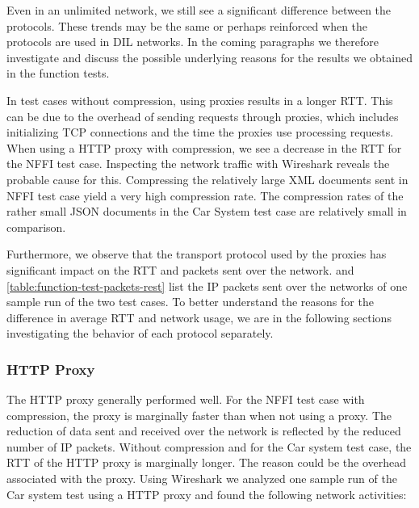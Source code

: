Even in an unlimited network, we still see a significant difference between the
protocols. These trends may be the same or perhaps reinforced when the protocols
are used in DIL networks. In the coming paragraphs we therefore investigate and
discuss the possible underlying reasons for the results we obtained in the
function tests.

In test cases without compression, using proxies results in a longer RTT. This
can be due to the overhead of sending requests through proxies, which includes
initializing TCP connections and the time the proxies use processing requests.
When using a HTTP proxy with compression, we see a decrease in the RTT for the
NFFI test case. Inspecting the network traffic with Wireshark reveals the
probable cause for this. Compressing the relatively large XML documents sent in
NFFI test case yield a very high compression rate. The compression rates of the
rather small JSON documents in the Car System test case are relatively small in
comparison.

Furthermore, we observe that the transport protocol used by the proxies has
significant impact on the RTT and packets sent over the network.
 and
\cref{table:function-test-packets-rest} list the IP packets sent over the
networks of one sample run of the two test cases. To better understand the
reasons for the difference in average RTT and network usage, we are in the
following sections investigating the behavior of each protocol separately.

\subsubsection{HTTP Proxy}

The HTTP proxy generally performed well. For the NFFI test case with
compression, the proxy is marginally faster than when not using a proxy. The
reduction of data sent and received over the network is reflected by the reduced
number of IP packets. Without compression and for the Car system test case, the
RTT of the HTTP proxy is marginally longer. The reason could be the overhead
associated with the proxy. Using Wireshark we analyzed one sample run of the Car
system test using a HTTP proxy and found the following network activities:

